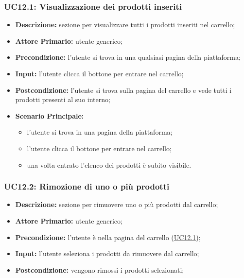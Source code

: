 \subsubsection{UC12.1: Visualizzazione dei prodotti inseriti}
\label{sec:UC12.1}
\begin{itemize}
    \item \textbf{Descrizione:} sezione per visualizzare tutti i prodotti inseriti nel carrello;
    \item \textbf{Attore Primario:} utente generico;
    \item \textbf{Precondizione:}  l'utente si trova in una qualsiasi pagina della piattaforma;
    \item \textbf{Input:} l'utente clicca il bottone per entrare nel carrello;
    \item \textbf{Postcondizione:} l'utente si trova sulla pagina del carrello e vede tutti i prodotti presenti al suo interno;
    \item \textbf{Scenario Principale:}
          \begin{itemize}
              \item l'utente si trova in una pagina della piattaforma;
              \item l'utente clicca il bottone per entrare nel carrello;
              \item una volta entrato l'elenco dei prodotti è subito visibile.
          \end{itemize}
\end{itemize}
\subsubsection{UC12.2: Rimozione di uno o più prodotti}
\label{sec:UC12.2}
\begin{itemize}
    \item \textbf{Descrizione:} sezione per rimuovere uno o più prodotti dal carrello;
    \item \textbf{Attore Primario:} utente generico;
    \item \textbf{Precondizione:} l'utente è nella pagina del carrello (\hyperref[sec:UC12.1]{\underline{UC12.1}});
    \item \textbf{Input:} l'utente seleziona i prodotti da rimuovere dal carrello;
    \item \textbf{Postcondizione:} vengono rimossi i prodotti selezionati;
\end{itemize}

